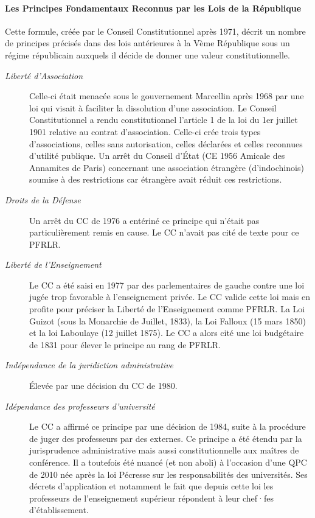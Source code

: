 \documentclass[math]{cours}
\begin{document}
\paragraph{Les Principes Fondamentaux Reconnus par les Lois de la République}
Cette formule, créée par le Conseil Constitutionnel après 1971, décrit un nombre de principes précisés dans des lois antérieures à la Vème République sous un régime républicain auxquels il décide de donner une valeur constitutionnelle.
\begin{description}
	\item[\emph{Liberté d'Association}] Celle-ci était menacée sous le gouvernement Marcellin après 1968 par une loi qui visait à faciliter la dissolution d'une association.
		Le Conseil Constitutionnel a rendu constitutionnel l'article 1 de la loi du 1er juillet 1901 relative au contrat d'association.
		Celle-ci crée trois types d'associations, celles sans autorisation, celles déclarées et celles reconnues d'utilité publique.
		Un arrêt du Conseil d'État (CE 1956 Amicale des Annamites de Paris) concernant une association étrangère (d'indochinois) soumise à des restrictions car étrangère avait réduit ces restrictions.
	\item[\emph{Droits de la Défense}] Un arrêt du CC de 1976 a entériné ce principe qui n'était pas particulièrement remis en cause.
		Le CC n'avait pas cité de texte pour ce PFRLR.
	\item[\emph{Liberté de l'Enseignement}] Le CC a été saisi en 1977 par des parlementaires de gauche contre une loi jugée trop favorable à l'enseignement privée.
		Le CC valide cette loi mais en profite pour préciser la Liberté de l'Enseignement comme PFRLR.
		La Loi Guizot (sous la Monarchie de Juillet, 1833), la Loi Falloux (15 mars 1850) et la loi Laboulaye (12 juillet 1875).
		Le CC a alors cité une loi budgétaire de 1831 pour élever le principe au rang de PFRLR.
	\item[\emph{Indépendance de la juridiction administrative}] Élevée par une décision du CC de 1980.
	\item[\emph{Idépendance des professeurs d'université}] Le CC a affirmé ce principe par une décision de 1984, suite à la procédure de juger des professeurs par des externes.
		Ce principe a été étendu par la jurisprudence administrative mais aussi constitutionnelle aux maîtres de conférence.
		Il a toutefois été nuancé (et non aboli) à l'occasion d'une QPC de 2010 née après la loi Pécresse sur les responsabilités des universités.
		Ses décrets d'application et notamment le fait que depuis cette loi les professeurs de l'enseignement supérieur répondent à leur chef·fes d'établissement.

\end{description}
\end{document}
